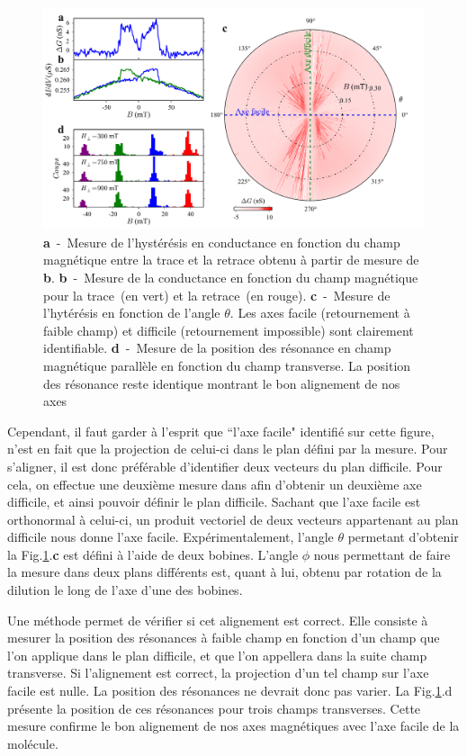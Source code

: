 \begin{figure}
\includegraphics[scale=0.45]{Resultats/Alignement/Alignement.pdf} 
\caption{\textbf{a}~-~Mesure de l’hystérésis en conductance en fonction du champ magnétique entre la trace et la retrace obtenu à partir de mesure de \textbf{b}. \textbf{b}~-~Mesure de la conductance en fonction du champ magnétique pour la trace~(en vert) et la retrace~(en rouge). \textbf{c}~-~Mesure de l'hytérésis en fonction de l'angle $\theta$. Les axes facile (retournement à faible champ) et difficile (retournement impossible) sont clairement identifiable. \textbf{d}~-~Mesure de la position des résonance en champ magnétique parallèle en fonction du champ transverse. La position des résonance reste identique montrant le bon alignement de nos axes}
\label{alignement}
\end{figure}

Cependant, il faut garder à l'esprit que ``l'axe facile" identifié sur cette figure, n'est en fait que la projection de celui-ci dans le plan défini par la mesure. Pour s'aligner, il est donc préférable d'identifier deux vecteurs du plan difficile. Pour cela, on effectue une deuxième mesure dans afin d'obtenir un deuxième axe difficile, et ainsi pouvoir définir le plan difficile. Sachant que l'axe facile est orthonormal à celui-ci, un produit vectoriel de deux vecteurs appartenant au plan difficile nous donne l'axe facile. Expérimentalement, l'angle $\theta$ permetant d'obtenir la Fig.\ref{alignement}.\textbf{c} est défini à l'aide de deux bobines. L'angle $\phi$ nous permettant de faire la mesure dans deux plans différents est, quant à lui, obtenu par rotation de la dilution le long de l'axe d'une des bobines.


Une méthode permet de vérifier si cet alignement est correct.  Elle consiste à mesurer la position des résonances à faible champ en fonction d'un champ que l'on applique dans le plan difficile, et que l'on appellera dans la suite champ transverse. Si l'alignement est correct, la projection d'un tel champ sur l'axe facile est nulle. La position des résonances ne devrait donc pas varier. La Fig.\ref{alignement}.d présente la position de ces résonances pour trois champs transverses. Cette mesure confirme le bon alignement de nos axes magnétiques avec l'axe facile de la molécule.

